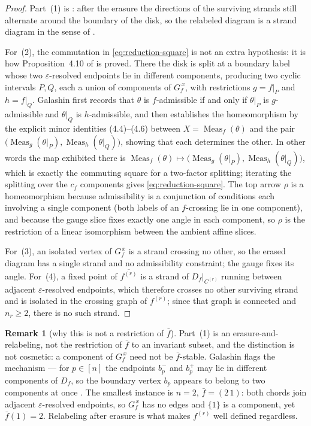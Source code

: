 \documentclass[11pt]{article}
\theoremstyle{definition}
\newtheorem{remark}[theorem]{Remark}
\DeclareMathOperator{\Meas}{Meas}
\newcommand{\ba}{\bar f}
\begin{document}
\begin{proof}
Part~(1) is \cite[\S4.4]{Galashin}: after the erasure the directions of the surviving strands
still alternate around the boundary of the disk, so the relabeled diagram is a strand diagram in the
sense of \cite[Def.~4.5]{Galashin}.

For~(2), the commutation in \eqref{eq:reduction-square} is not an extra hypothesis: it is how
Proposition~4.10 of \cite{Galashin} is proved. There the disk is split at a boundary label whose two
$\varepsilon$-resolved endpoints lie in different components, producing two cyclic intervals $P,Q$, each
a union of components of $G_f^{\,x}$, with restrictions $g=f|_P$ and $h=f|_Q$. Galashin first records
that $\theta$ is $f$-admissible if and only if $\theta|_P$ is $g$-admissible and $\theta|_Q$ is
$h$-admissible, and then establishes the homeomorphism by the explicit minor identities (4.4)--(4.6)
between $X=\Meas_f(\theta)$ and the pair $\bigl(\Meas_g(\theta|_P),\Meas_h(\theta|_Q)\bigr)$, showing
that each determines the other. In other words the map exhibited there is
$\Meas_f(\theta)\mapsto\bigl(\Meas_g(\theta|_P),\Meas_h(\theta|_Q)\bigr)$, which is exactly the
commuting square for a two-factor splitting; iterating the splitting over the $c_f$ components gives
\eqref{eq:reduction-square}. The top arrow $\rho$ is a homeomorphism because admissibility is a
conjunction of conditions each involving a single component (both labels of an $f$-crossing lie in one
component), and because the gauge slice fixes exactly one angle in each component, so $\rho$ is the
restriction of a linear isomorphism between the ambient affine slices.

For~(3), an isolated vertex of $G_f^{\,x}$ is a strand
crossing no other, so the erased diagram has a single strand and no admissibility constraint; the gauge
fixes its angle. For~(4), a fixed point of $\overline{f^{(r)}}$ is a strand of $D_f|_{C^{(r)}}$ running
between adjacent $\varepsilon$-resolved endpoints, which therefore crosses no other surviving strand and is
isolated in the crossing graph of $f^{(r)}$; since that graph is connected and $n_r\ge2$, there is no such
strand.
\end{proof}

\begin{remark}[why this is not a restriction of $\ba$]\label{rem:not-restriction}
Part~(1) is an erasure-and-relabeling, not the restriction of $\ba$ to an invariant subset, and the
distinction is not cosmetic: a component of $G_f^{\,x}$ need not be $\ba$-stable. Galashin flags the
mechanism --- for $p\in[n]$ the endpoints $b^-_p$ and $b^+_p$ may lie in different components of $D_f$,
so the boundary vertex $b_p$ appears to belong to two components at once \cite[\S4.4]{Galashin}. The
smallest instance is $n=2$, $\ba=(2\,1)$: both chords join adjacent $\varepsilon$-resolved endpoints, so
$G_f^{\,x}$ has no edges and $\{1\}$ is a component, yet $\ba(1)=2$. Relabeling after erasure is what makes
$f^{(r)}$ well defined regardless.
\end{remark}
\end{document}

